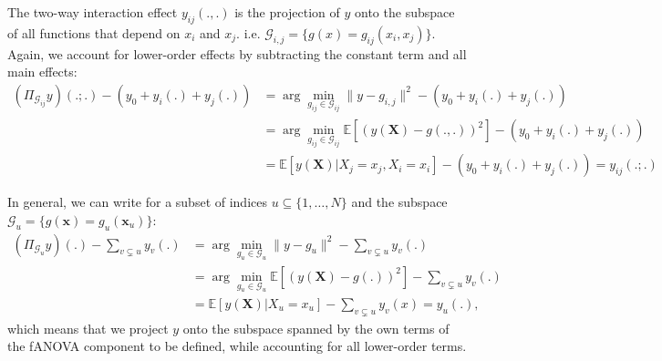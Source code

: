 The two-way interaction effect $y_{ij}(.,.)$ is the projection of $y$ onto the subspace of all functions that depend on $x_i$ and $x_j$. i.e. $\mathcal{G}_{i,j} = \{g(x) = g_{ij}(x_i, x_j)\}$. Again, we account for lower-order effects by subtracting the constant term and all main effects:
\begin{align*}
    (\Pi_{\mathcal{G}_{ij}}y)(.;.) - (y_0 + y_i(.) + y_j(.))
    &= \arg \min_{g_{ij} \in \mathcal{G}_{ij}} \|y - g_{i, j}\|^2 - (y_0 + y_i(.) + y_j(.))\\
    &= \arg \min_{g_{ij} \in \mathcal{G}_{ij}} \mathbb{E}[(y(\boldsymbol{X}) - g(., .))^2] - (y_0 + y_i(.) + y_j(.))\\
    &= \mathbb{E}[y(\boldsymbol{X}) | X_j = x_j, X_i = x_i] - (y_0 + y_i(.) + y_j(.)) = y_{ij}(.;.)
\end{align*}

In general, we can write for a subset of indices $u \subseteq \{1, \dots, N\}$ and the subspace $\mathcal{G}_u = \{g(\boldsymbol{x}) = g_u(\boldsymbol{x}_u)\}$:
\begin{align*}
    (\Pi_{\mathcal{G}_u}y)(.) - \sum_{v \subsetneq u} y_v(.)
    &= \arg \min_{g_u \in \mathcal{G}_u} \|y - g_u\|^2 - \sum_{v \subsetneq u} y_v(.)\\
    &= \arg \min_{g_u \in \mathcal{G}_{u}} \mathbb{E}[(y(\boldsymbol{X}) - g(.))^2] - \sum_{v \subsetneq u} y_v(.)\\
    &= \mathbb{E}[y(\boldsymbol{X}) | X_{u} = x_u] - \sum_{v \subsetneq u} y_v(x) = y_u(.),
\end{align*}
which means that we project $y$ onto the subspace spanned by the own terms of the fANOVA component to be defined, while accounting for all lower-order terms.

